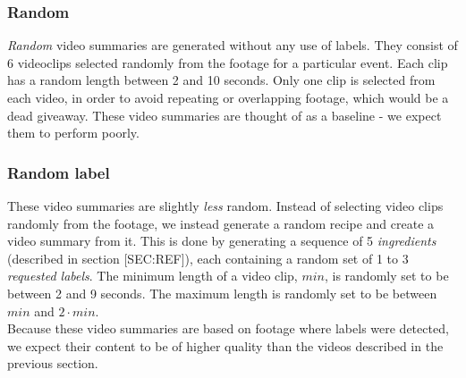 \subsubsection{Random}
%
\textit{Random} video summaries are generated without any use of labels. They consist of 6 videoclips selected randomly from the footage for a particular event. Each clip has a random length between 2 and 10 seconds. Only one clip is selected from each video, in order to avoid repeating or overlapping footage, which would be a dead giveaway. These video summaries are thought of as a baseline - we expect them to perform poorly.
%
\subsubsection{Random label}
%
These video summaries are slightly \textit{less} random. Instead of selecting video clips randomly from the footage, we instead generate a random recipe and create a video summary from it. This is done by generating a sequence of 5 \textit{ingredients} (described in section [SEC:REF]), each containing a random set of 1 to 3 \textit{requested labels}. The minimum length of a video clip, $min$, is randomly set to be between 2 and 9 seconds. The maximum length is randomly set to be between $min$ and $2 \cdot min$.\\
Because these video summaries are based on footage where labels were detected, we expect their content to be of higher quality than the videos described in the previous section.
%
